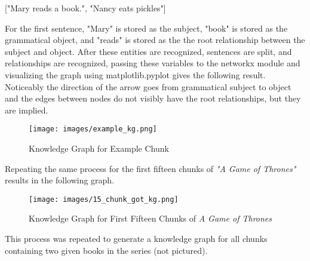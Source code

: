 \begin{center}
["Mary reads a book.", "Nancy eats pickles"]
\end{center}
\bigskip

For the first sentence, "Mary" is stored as the subject, "book" is stored as the grammatical object, and "reads" is stored as the the root relationship between the subject and object. After these entities are recognized, sentences are split, and relationships are recognized, passing these variables to the networkx module and visualizing the graph using matplotlib.pyplot gives the following result. Noticeably the direction of the arrow goes from grammatical subject to object and the edges between nodes do not visibly have the root relationships, but they are implied.

\begin{figure}[h]
    \centering
    \texttt{[image: images/example\_kg.png]}
    \caption{Knowledge Graph for Example Chunk}
    \label{fig:enter-label}
\end{figure}

\newpage

Repeating the same process for the first fifteen chunks of \textit{"A Game of Thrones"} results in the following graph.

\begin{figure}[h]
    \centering
    \texttt{[image: images/15\_chunk\_got\_kg.png]}
    \caption{Knowledge Graph for First Fifteen Chunks of \textit{A Game of Thrones}}
    \label{fig:enter-label}
\end{figure} \par

This process was repeated to generate a knowledge graph for all chunks containing two given books in the series (not pictured).

\bigskip
